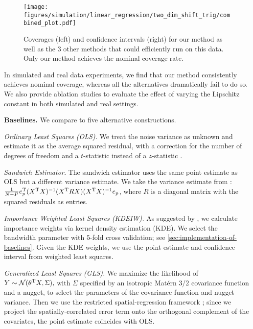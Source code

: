 \begin{figure*}
    \centering
    \texttt{[image: figures/simulation/linear\_regression/two\_dim\_shift\_trig/combined\_plot.pdf]}
    \caption{Coverages (left) and confidence intervals (right) for our method as well as the 3 other methods that could efficiently run on this data. Only our method achieves the nominal coverage rate.}
    \label{fig:combined-plot-simulation-trig}
\end{figure*}


In simulated and real data experiments, we find that our
method consistently achieves nominal coverage, whereas all the alternatives dramatically fail to do so. We also provide ablation studies to evaluate the effect of varying the Lipschitz constant in both simulated and real settings.

\textbf{Baselines.} We compare to five alternative constructions.

\emph{Ordinary Least Squares (OLS).}
We treat the noise variance as unknown and estimate it as the average squared residual, with a correction for the number of degrees of freedom and a $t$-statistic instead of a $z$-statistic \citep[pp.\ 50--52]{greene2011econometric}.

\emph{Sandwich Estimator.}
The sandwich estimator \citep{huber_behavior_1967, white_heteroskedasticity-consistent_1980,white_1980_usingleastsquares} uses the same point estimate as OLS but a different variance estimate. We take the variance estimate from \citet[Equation 6]{MACKINNON1985305}: $\frac{1}{N-P}e_p^{\mathrm{T}}(X^{\mathrm{T}}X)^{-1}(X^{\mathrm{T}}RX)(X^{\mathrm{T}}X)^{-1}e_p$, where $R$ is a diagonal matrix with the squared residuals as entries. 

\emph{Importance Weighted Least Squares (KDEIW).}
As suggested by \citet[Section 9]{shimodaira_improving_2000}, we calculate importance weights via kernel density estimation (KDE). We select the bandwidth parameter with $5$-fold cross validation; see \cref{sec:implementation-of-baselines}. Given the KDE weights, we use the point estimate and confidence interval from weighted least squares.

\emph{Generalized Least Squares (GLS).}
We maximize the likelihood of 
$
    Y \sim \mathcal{N}(\theta^{\mathrm{T}} X, \Sigma),
$
with $\Sigma$ specified by an isotropic Mat\'ern 3/2 covariance function and a nugget, to select the parameters of the covariance function and nugget variance. Then we use the restricted spatial-regression framework \citep{hodges2010adding}; since we project the spatially-correlated error term onto the orthogonal complement of the covariates, the point estimate coincides with OLS. %

